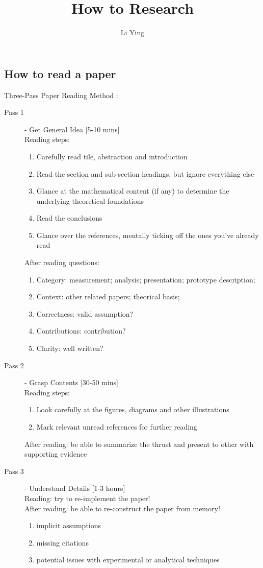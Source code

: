 \documentclass[a4paper,11pt]{article}
\author{Li Ying}
\title{How to Research}
\begin{document}
\maketitle


\subsection*{How to read a paper}
{
Three-Pass Paper Reading Method \cite{readpaper}:
\begin{description}
\item[Pass 1] - Get General Idea [5-10 mins]  \hfill \\
Reading steps: 
\begin{enumerate}
\item Carefully read tile, abstraction and introduction
\item Read the section and sub-section headings, but ignore everything else
\item Glance at the mathematical content (if any) to determine the underlying theoretical foundations
\item Read the conclusions
\item Glance over the references, mentally ticking off the ones you've already read
\end{enumerate}
After reading questions:
\begin{enumerate}
\item Category: measurement; analysis; presentation; prototype description;
\item Context: other related papers; theorical basis;
\item Correctness: valid assumption?
\item Contributions: contribution?
\item Clarity: well written?
\end{enumerate}
\item[Pass 2] - Grasp Contents [30-50 mins] \hfill \\
Reading steps:
\begin{enumerate}
\item Look carefully at the figures, diagrams and other illustrations
\item Mark relevant unread references for further reading
\end{enumerate}
After reading: be able to summarize the thrust and present to other with supporting evidence
\item[Pass 3] - Understand Details [1-3 hours]\hfill \\
Reading: try to re-implement the paper! \\
After reading: be able to re-construct the paper from memory!
\begin{enumerate}
\item implicit assumptions
\item missing citations
\item potential issues with experimental or analytical techniques
\end{enumerate}
\end{description}	
}



\end{document}
